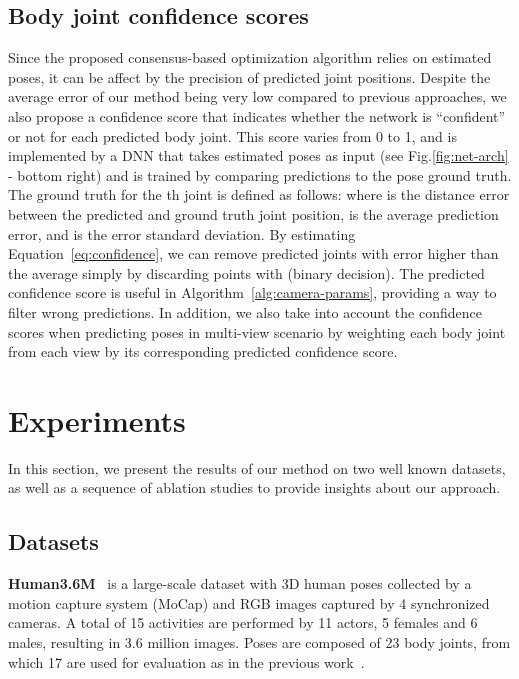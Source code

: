 \documentclass[10pt,twocolumn,letterpaper]{article}
\newcommand{\rev}[1]{#1}
\newcommand{\revb}[1]{{#1}}
\begin{document}
\subsection{Body joint confidence scores}

\rev{
Since the proposed consensus-based optimization algorithm relies on estimated
poses, it can be affect by the precision of predicted joint positions. Despite
the average error of our method being very low compared to previous approaches, 
we also propose a confidence score that indicates whether the network
is ``confident'' or not for each predicted body joint. This score varies from
0 to 1, and is implemented by a DNN that takes estimated poses as input (see
Fig.\ref{fig:net-arch} - bottom right) \revb{and is trained by comparing predictions to the pose ground truth}. The ground truth for the th joint is
defined as follows:
 where  is the distance error between the predicted and
ground truth joint position,  is the average prediction error, and
 is the error standard deviation. By estimating
Equation~\ref{eq:confidence}, we can remove predicted joints with error higher
than the average simply by discarding points with  \revb{(binary decision)}.
The predicted confidence score  is useful in
Algorithm~\ref{alg:camera-params}, \revb{providing a way to filter wrong predictions.}
In addition, we also take into account the confidence scores when predicting
poses in multi-view scenario by weighting each body joint from each view by its
corresponding predicted confidence score.
}






\section{Experiments}
\label{sec:experiments}


In this section, we present the results of our method on two well known
datasets, as well as a sequence of ablation studies to provide  insights about
our approach.

\subsection{Datasets}

\textbf{Human3.6M}~\cite{h36m_pami} is a large-scale dataset with 3D human
poses collected by a motion capture system (MoCap) and RGB images captured by 4
synchronized cameras.  A total of 15 activities are performed by 11 actors, 5
females and 6 males, resulting in 3.6 million images.  Poses are
composed of 23 body joints, from which 17 are used for evaluation \revb{as in the previous work~\cite{Pavlakos_2017_CVPR, Zanfir_2018_CVPR}}.
\end{document}
